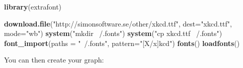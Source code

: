 \documentclass[]{article}
\newenvironment{Shaded}{\begin{snugshade}}{\end{snugshade}}
\newcommand{\KeywordTok}[1]{\textcolor[rgb]{0.13,0.29,0.53}{\textbf{{#1}}}}
\newcommand{\DataTypeTok}[1]{\textcolor[rgb]{0.13,0.29,0.53}{{#1}}}
\newcommand{\StringTok}[1]{\textcolor[rgb]{0.31,0.60,0.02}{{#1}}}
\newcommand{\NormalTok}[1]{{#1}}
\begin{document}
\begin{Shaded}
\begin{Highlighting}[]
\KeywordTok{library}\NormalTok{(extrafont)}

\KeywordTok{download.file}\NormalTok{(}\StringTok{"http://simonsoftware.se/other/xkcd.ttf"}\NormalTok{, }
              \DataTypeTok{dest=}\StringTok{"xkcd.ttf"}\NormalTok{, }\DataTypeTok{mode=}\StringTok{"wb"}\NormalTok{)}
\KeywordTok{system}\NormalTok{(}\StringTok{"mkdir ~/.fonts"}\NormalTok{)}
\KeywordTok{system}\NormalTok{(}\StringTok{"cp xkcd.ttf  ~/.fonts"}\NormalTok{)}
\KeywordTok{font_import}\NormalTok{(}\DataTypeTok{paths =} \StringTok{"~/.fonts"}\NormalTok{, }\DataTypeTok{pattern=}\StringTok{"[X/x]kcd"}\NormalTok{)}
\KeywordTok{fonts}\NormalTok{()}
\KeywordTok{loadfonts}\NormalTok{()}
\end{Highlighting}
\end{Shaded}

You can then create your graph:
\end{document}
